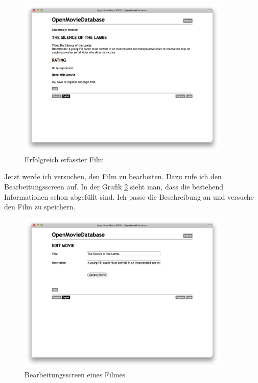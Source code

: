 \begin{figure}[ht]
    \begin{center}
        \includegraphics[width=0.9\textwidth,angle=0]{./bilder/tests/test_movie_02.png}
        \caption{Erfolgreich erfasster Film}
        \label{test_movie_02}
    \end{center}
\end{figure}

\clearpage

Jetzt werde ich versuchen, den Film zu bearbeiten. Dazu rufe ich den Bearbeitungsscreen
auf. In der Grafik \ref{test_movie_03} sieht man, dass die bestehend Informationen
schon abgefüllt sind. Ich passe die Beschreibung an und versuche den Film
zu speichern.

\begin{figure}[ht]
    \begin{center}
        \includegraphics[width=0.9\textwidth,angle=0]{./bilder/tests/test_movie_03.png}
        \caption{Bearbeitungsscreen eines Filmes}
        \label{test_movie_03}
    \end{center}
\end{figure}

